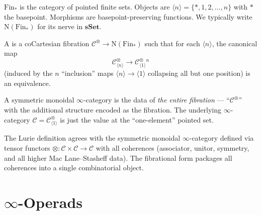 \begin{definition}
\label{def:fin-star}
$\mathrm{Fin}_*$ is the category of pointed finite sets. Objects are
$\langle n \rangle = \{*, 1, 2, \ldots, n\}$ with $*$ the basepoint.
Morphisms are basepoint-preserving functions. We typically write
$\mathrm{N}(\mathrm{Fin}_*)$ for its nerve in $\mathbf{sSet}$.
\end{definition}

\begin{definition}
\label{def:sym-mon-infty-cat}
A  is a coCartesian fibration
$\mathcal{C}^\otimes \to \mathrm{N}(\mathrm{Fin}_*)$ such that for each
$\langle n \rangle$, the canonical map
\begin{equation*}
  \mathcal{C}^\otimes_{\langle n \rangle} \to \mathcal{C}^\otimes_{\langle 1 \rangle}{}^n
\end{equation*}
(induced by the $n$ ``inclusion'' maps $\langle n \rangle \to \langle 1
\rangle$ collapsing all but one position) is an equivalence.
\end{definition}

\begin{howtosay}
A symmetric monoidal $\infty$-category  is the data of \emph{the entire fibration} —
``$\mathcal{C}^\otimes$'' with the additional structure encoded as the
fibration. The underlying $\infty$-category $\mathcal{C} =
\mathcal{C}^\otimes_{\langle 1 \rangle}$ is just the value at the
``one-element'' pointed set.
\end{howtosay}

\begin{theorem}
\label{thm:sym-mon-equiv}
The Lurie definition agrees with the symmetric monoidal $\infty$-category
defined via tensor functors $\otimes : \mathcal{C} \times \mathcal{C} \to
\mathcal{C}$ with all coherences (associator, unitor, symmetry, and all
higher Mac Lane–Stasheff data). The fibrational form packages all
coherences into a single combinatorial object.
\end{theorem}


\section{$\infty$-Operads}
\label{sec:infty-operad-defn}

